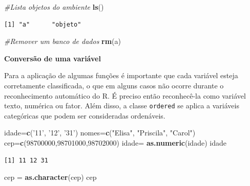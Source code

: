 \documentclass[12pt,brazil,oneside]{book}
\newenvironment{Shaded}{\begin{snugshade}}{\end{snugshade}}
\newcommand{\CommentTok}[1]{\textcolor[rgb]{0.56,0.35,0.01}{\textit{#1}}}
\newcommand{\DecValTok}[1]{\textcolor[rgb]{0.00,0.00,0.81}{#1}}
\newcommand{\KeywordTok}[1]{\textcolor[rgb]{0.13,0.29,0.53}{\textbf{#1}}}
\newcommand{\NormalTok}[1]{#1}
\newcommand{\StringTok}[1]{\textcolor[rgb]{0.31,0.60,0.02}{#1}}
\begin{document}
\begin{Shaded}
\begin{Highlighting}[]
\CommentTok{#Lista objetos do ambiente}
\KeywordTok{ls}\NormalTok{()}
\end{Highlighting}
\end{Shaded}

\begin{verbatim}
[1] "a"      "objeto"
\end{verbatim}

\begin{Shaded}
\begin{Highlighting}[]
\CommentTok{#Remover um banco de dados}
\KeywordTok{rm}\NormalTok{(a)}
\end{Highlighting}
\end{Shaded}

\textbf{Conversão de uma variável}

Para a aplicação de algumas funções é importante que cada variável esteja corretamente classificada, o que em alguns casos não ocorre durante o reconhecimento automático do R. É preciso então reconhecê-la como variável texto, numérica ou fator. Além disso, a classe \texttt{ordered} se aplica a variáveis categóricas que podem ser consideradas ordenáveis.

\begin{Shaded}
\begin{Highlighting}[]
\NormalTok{idade=}\KeywordTok{c}\NormalTok{(}\StringTok{'11'}\NormalTok{, }\StringTok{'12'}\NormalTok{, }\StringTok{'31'}\NormalTok{)}
\NormalTok{nomes=}\KeywordTok{c}\NormalTok{(}\StringTok{"Elisa"}\NormalTok{, }\StringTok{"Priscila"}\NormalTok{, }\StringTok{"Carol"}\NormalTok{)}
\NormalTok{cep=}\KeywordTok{c}\NormalTok{(}\DecValTok{98700000}\NormalTok{,}\DecValTok{98701000}\NormalTok{,}\DecValTok{98702000}\NormalTok{)}
\NormalTok{idade=}\StringTok{ }\KeywordTok{as.numeric}\NormalTok{(idade)}
\NormalTok{idade}
\end{Highlighting}
\end{Shaded}

\begin{verbatim}
[1] 11 12 31
\end{verbatim}

\begin{Shaded}
\begin{Highlighting}[]
\NormalTok{cep =}\StringTok{ }\KeywordTok{as.character}\NormalTok{(cep)}
\NormalTok{cep}
\end{Highlighting}
\end{Shaded}
\end{document}
